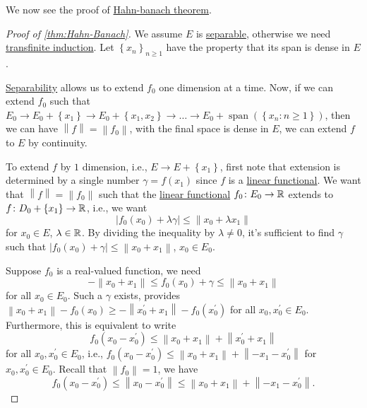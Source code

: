 We now see the proof of \hyperref[thm:Hahn-Banach]{Hahn-banach theorem}.

\begin{proof}[Proof of \autoref{thm:Hahn-Banach}]
	We assume \(E\) is \hyperref[def:separable]{separable}, otherwise we need \href{https://en.wikipedia.org/wiki/Transfinite_induction}{transfinite induction}. Let \(\left\{ x_{n} \right\}_{n \geq 1} \) have the property that its span is dense in \(E\).

	\begin{intuition}
		\hyperref[def:separable]{Separability} allows us to extend \(f_0\) one dimension at a time.  Now, if we can extend \(f_0\) such that \(E_0 \to E_0 + \left\{ x_1 \right\} \to E_0 + \left\{ x_1, x_2 \right\} \to \ldots \to E_0 + \mathop{\mathrm{span}}(\left\{ x_n\colon n \geq 1 \right\} ) \), then we can have \(\left\lVert f\right\rVert = \left\lVert f_0\right\rVert \), with the final space is dense in \(E\), we can extend \(f\) to \(E\) by continuity.
	\end{intuition}

	To extend \(f\) by \(1\) dimension, i.e., \(E \to E + \left\{ x_1 \right\} \), first note that extension is determined by a single number \(\gamma = f(x_1)\) since \(f\) is a \hyperref[def:linear-functional]{linear functional}. We want that \(\left\lVert f\right\rVert = \left\lVert f_0\right\rVert \) such that the \hyperref[def:linear-functional]{linear functional} \(f_0 \colon E_0 \to \mathbb{\MakeUppercase{r}} \) extends to \(f\colon D_0 + \left\{ x_1 \right\} \to \mathbb{\MakeUppercase{r}} \), i.e., we want
	\[
		\left\vert f_0 (x_0) + \lambda \gamma \right\vert \leq \left\lVert x_0 + \lambda  x_1\right\rVert
	\]
	for \(x_ 0 \in E\), \(\lambda \in \mathbb{\MakeUppercase{r}} \). By dividing the inequality by \(\lambda \neq 0\), it's sufficient to find \(\gamma \) such that \(\left\vert f_0(x_0) + \gamma  \right\vert \leq \left\lVert x_0 + x_1\right\rVert  \), \(x_0 \in E_0\).

	Suppose \(f_0\) is a real-valued function, we need
	\[
		- \left\lVert x_0 + x_1\right\rVert \leq f_0(x_0) + \gamma \leq \left\lVert x_0 + x_1\right\rVert
	\]
	for all \(x_0 \in E_0\). Such a \(\gamma \) exists, provides \(\left\lVert x_0 + x_1\right\rVert - f_0(x_0) \geq -\left\lVert x_0^\prime + x_1\right\rVert - f_0(x_0^\prime )\) for all \(x_0, x_0^\prime \in E_0\). Furthermore, this is equivalent to write
	\[
		f_0(x_0 - x_0^\prime ) \leq \left\lVert x_0 + x_1\right\rVert + \left\lVert x_0^\prime + x_1\right\rVert
	\]
	for all \(x_0, x_0^\prime \in E_0\), i.e., \(f_0(x_0 - x_0^\prime ) \leq \left\lVert x_0 + x_1\right\rVert + \left\lVert - x_1 - x_0^\prime \right\rVert \) for \(x_0, x_0^\prime \in E_0\). Recall that \(\left\lVert f_0\right\rVert = 1\), we have
	\[
		f_0(x_0 - x_0^\prime ) \leq \left\lVert x_0 - x_0^\prime \right\rVert \leq \left\lVert x_0 + x_1\right\rVert + \left\lVert -x_1 - x_0^\prime \right\rVert.
	\]


\end{proof}
